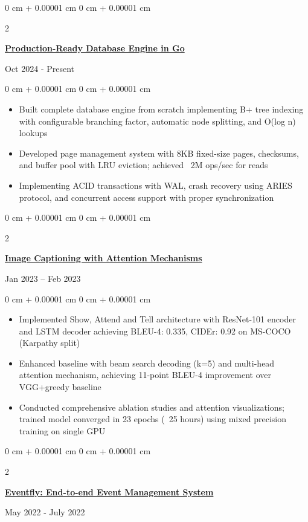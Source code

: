 \documentclass[10pt, letterpaper]{article}
\newenvironment{highlights}{
    \begin{itemize}[
        topsep=0.10 cm,
        parsep=0.10 cm,
        partopsep=0pt,
        itemsep=0pt,
        leftmargin=0 cm + 10pt
    ]
}{
    \end{itemize}
} %
\newenvironment{onecolentry}{
    \begin{adjustwidth}{
        0 cm + 0.00001 cm
    }{
        0 cm + 0.00001 cm
    }
}{
    \end{adjustwidth}
} %
\newenvironment{twocolentry}[2][]{
    \onecolentry
    \def\secondColumn{#2}
    \setcolumnwidth{\fill, 4.5 cm}
    \begin{paracol}{2}
}{
    \switchcolumn \raggedleft \secondColumn
    \end{paracol}
    \endonecolentry
} %
\begin{document}
        \begin{twocolentry}{
            {Oct 2024 - Present}
        }
            \href{https://github.com/thromel/go-database}{\textbf{Production-Ready Database Engine in Go}}
        \end{twocolentry}
        \begin{onecolentry}
            \begin{highlights}
                \item Built complete database engine from scratch implementing B+ tree indexing with configurable branching factor, automatic node splitting, and O(log n) lookups
                \item Developed page management system with 8KB fixed-size pages, checksums, and buffer pool with LRU eviction; achieved ~2M ops/sec for reads
                \item Implementing ACID transactions with WAL, crash recovery using ARIES protocol, and concurrent access support with proper synchronization
            \end{highlights}
        \end{onecolentry}

        \begin{twocolentry}{
    {Jan 2023 – Feb 2023}
}
    \href{https://github.com/thromel/Image-Captioning-ML-Project}{\textbf{Image Captioning with Attention Mechanisms}}
\end{twocolentry}

\begin{onecolentry}
    \begin{highlights}
        \item Implemented Show, Attend and Tell architecture with ResNet-101 encoder and LSTM decoder achieving BLEU-4: 0.335, CIDEr: 0.92 on MS-COCO (Karpathy split)
        \item Enhanced baseline with beam search decoding (k=5) and multi-head attention mechanism, achieving 11-point BLEU-4 improvement over VGG+greedy baseline
        \item Conducted comprehensive ablation studies and attention visualizations; trained model converged in 23 epochs (~25 hours) using mixed precision training on single GPU
    \end{highlights}
\end{onecolentry}
        
\begin{twocolentry}{
            {May 2022 - July 2022}
        }
            \href{https://github.com/eventfly/Microservices}{\textbf{Eventfly: End-to-end Event Management System}}
        \end{twocolentry}
        
\end{document}
